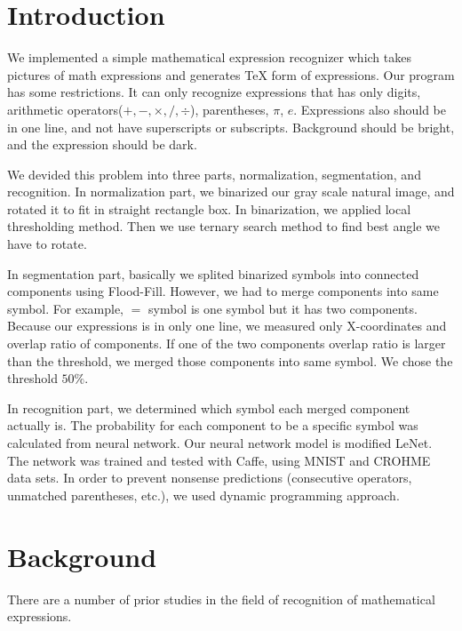 \documentclass[10pt,twocolumn,letterpaper]{article}
\begin{document}
\section{Introduction}

We implemented a simple mathematical expression recognizer which takes pictures of
math expressions and generates TeX form of expressions. Our program has some restrictions.
It can only recognize expressions that has only digits, arithmetic operators($+, -, \times, /, \div$),
parentheses, $\pi$, $e$. Expressions also should be in one line, and not have
superscripts or subscripts. Background should be bright, and the expression should be dark.

We devided this problem into three parts, normalization, segmentation, and recognition.
In normalization part, we binarized our gray scale natural image, and rotated it to
fit in straight rectangle box. In binarization, we applied local thresholding method.
Then we use ternary search method to find best angle we have to rotate.

In segmentation part, basically we splited binarized symbols into connected components
using Flood-Fill. However, we had to merge components into same symbol. For example,
$=$ symbol is one symbol but it has two components. Because our expressions is in only
one line, we measured only X-coordinates and overlap ratio of components. If one of the
two components overlap ratio is larger than the threshold, we merged those components
into same symbol. We chose the threshold $50\%$.

In recognition part, we determined which symbol each merged component actually is.
The probability for each component to be a specific symbol was calculated from neural network.
Our neural network model is modified LeNet\cite{LeNet}.
The network was trained and tested with Caffe, using MNIST\cite{MNIST} and CROHME\cite{CROHME} data sets.
In order to prevent nonsense predictions (consecutive operators, unmatched parentheses, etc.), we used dynamic programming approach.


\section{Background}

There are a number of prior studies in the field of recognition of mathematical expressions.
\end{document}
